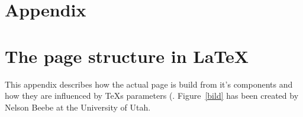 
\clearpage

\section*{Appendix}

\appendix

\section{The page structure in \LaTeX}

This appendix describes how the actual page is build from it's 
components and how they are influenced by \TeX s parameters 
(.  Figure~\ref{bild} has been created by 
Nelson Beebe at the University of Utah.

